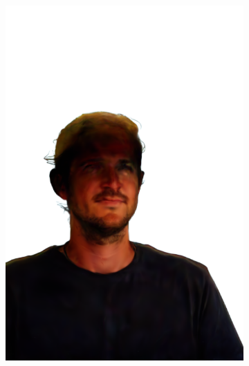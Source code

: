 \begin{figure}[ht]
\begin{subfigure}{0.08\linewidth}
        \includegraphics[width=\textwidth]{Figures/results/high/ephra_cowboy/11_render.png}

\end{subfigure}
\end{figure}

